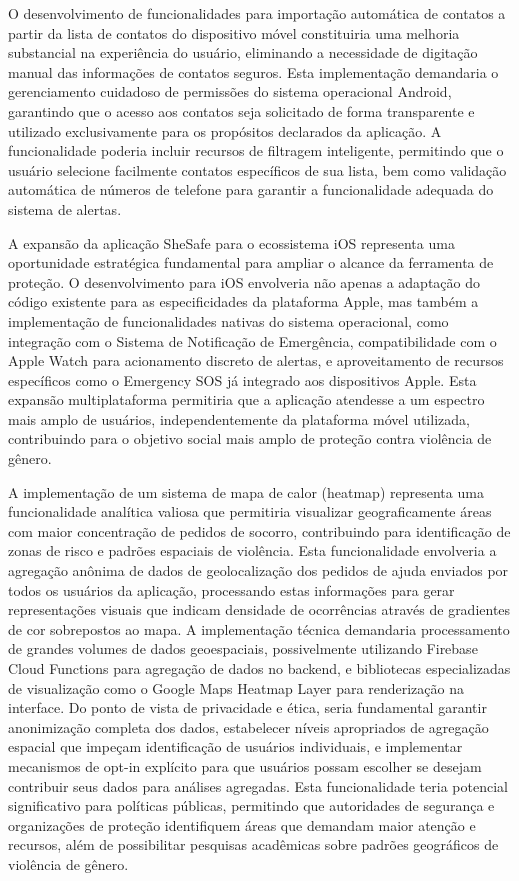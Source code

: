 O desenvolvimento de funcionalidades para importação automática de contatos a partir da lista de contatos do dispositivo móvel constituiria uma melhoria substancial na experiência do usuário, eliminando a necessidade de digitação manual das informações de contatos seguros. Esta implementação demandaria o gerenciamento cuidadoso de permissões do sistema operacional Android, garantindo que o acesso aos contatos seja solicitado de forma transparente e utilizado exclusivamente para os propósitos declarados da aplicação. A funcionalidade poderia incluir recursos de filtragem inteligente, permitindo que o usuário selecione facilmente contatos específicos de sua lista, bem como validação automática de números de telefone para garantir a funcionalidade adequada do sistema de alertas.

A expansão da aplicação SheSafe para o ecossistema iOS representa uma oportunidade estratégica fundamental para ampliar o alcance da ferramenta de proteção. O desenvolvimento para iOS envolveria não apenas a adaptação do código existente para as especificidades da plataforma Apple, mas também a implementação de funcionalidades nativas do sistema operacional, como integração com o Sistema de Notificação de Emergência, compatibilidade com o Apple Watch para acionamento discreto de alertas, e aproveitamento de recursos específicos como o Emergency SOS já integrado aos dispositivos Apple. Esta expansão multiplataforma permitiria que a aplicação atendesse a um espectro mais amplo de usuários, independentemente da plataforma móvel utilizada, contribuindo para o objetivo social mais amplo de proteção contra violência de gênero.

A implementação de um sistema de mapa de calor (heatmap) representa uma funcionalidade analítica valiosa que permitiria visualizar geograficamente áreas com maior concentração de pedidos de socorro, contribuindo para identificação de zonas de risco e padrões espaciais de violência. Esta funcionalidade envolveria a agregação anônima de dados de geolocalização dos pedidos de ajuda enviados por todos os usuários da aplicação, processando estas informações para gerar representações visuais que indicam densidade de ocorrências através de gradientes de cor sobrepostos ao mapa. A implementação técnica demandaria processamento de grandes volumes de dados geoespaciais, possivelmente utilizando Firebase Cloud Functions para agregação de dados no backend, e bibliotecas especializadas de visualização como o Google Maps Heatmap Layer para renderização na interface. Do ponto de vista de privacidade e ética, seria fundamental garantir anonimização completa dos dados, estabelecer níveis apropriados de agregação espacial que impeçam identificação de usuários individuais, e implementar mecanismos de opt-in explícito para que usuários possam escolher se desejam contribuir seus dados para análises agregadas. Esta funcionalidade teria potencial significativo para políticas públicas, permitindo que autoridades de segurança e organizações de proteção identifiquem áreas que demandam maior atenção e recursos, além de possibilitar pesquisas acadêmicas sobre padrões geográficos de violência de gênero.

